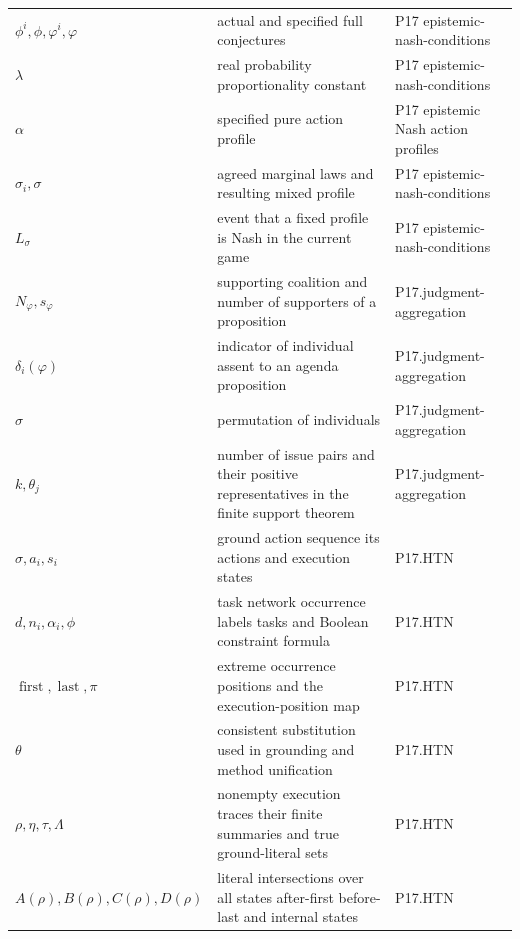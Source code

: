 \begin{longtable}{@{}p{}p{}p{}@{}}
\(\phi^i,\allowbreak \phi,\allowbreak \varphi^i,\allowbreak \varphi\) & actual and specified full conjectures & P17 epistemic-\allowbreak{}nash-\allowbreak{}conditions \\
\(\lambda\) & real probability proportionality constant & P17 epistemic-\allowbreak{}nash-\allowbreak{}conditions \\
\(\alpha\) & specified pure action profile & P17 epistemic Nash action profiles \\
\(\sigma_i,\allowbreak \sigma\) & agreed marginal laws and resulting mixed profile & P17 epistemic-\allowbreak{}nash-\allowbreak{}conditions \\
\(L_\sigma\) & event that a fixed profile is Nash in the current game & P17 epistemic-\allowbreak{}nash-\allowbreak{}conditions \\
\(N_\varphi,\allowbreak s_\varphi\) & supporting coalition and number of supporters of a proposition & P17.\allowbreak{}judgment-\allowbreak{}aggregation \\
\(\delta_i(\varphi)\) & indicator of individual assent to an agenda proposition & P17.\allowbreak{}judgment-\allowbreak{}aggregation \\
\(\sigma\) & permutation of individuals & P17.\allowbreak{}judgment-\allowbreak{}aggregation \\
\(k,\allowbreak \theta_j\) & number of issue pairs and their positive representatives in the finite support theorem & P17.\allowbreak{}judgment-\allowbreak{}aggregation \\
\(\sigma,\allowbreak a_i,\allowbreak s_i\) & ground action sequence its actions and execution states & P17.\allowbreak{}HTN \\
\(d,\allowbreak n_i,\allowbreak \alpha_i,\allowbreak \phi\) & task network occurrence labels tasks and Boolean constraint formula & P17.\allowbreak{}HTN \\
\(\operatorname{first},\allowbreak \operatorname{last},\allowbreak \pi\) & extreme occurrence positions and the execution-position map & P17.\allowbreak{}HTN \\
\(\theta\) & consistent substitution used in grounding and method unification & P17.\allowbreak{}HTN \\
\(\rho,\allowbreak \eta,\allowbreak \tau,\allowbreak \Lambda\) & nonempty execution traces their finite summaries and true ground-literal sets & P17.\allowbreak{}HTN \\
\(A(\rho),\allowbreak B(\rho),\allowbreak C(\rho),\allowbreak D(\rho)\) & literal intersections over all states after-first before-last and internal states & P17.\allowbreak{}HTN \\

\end{longtable}
